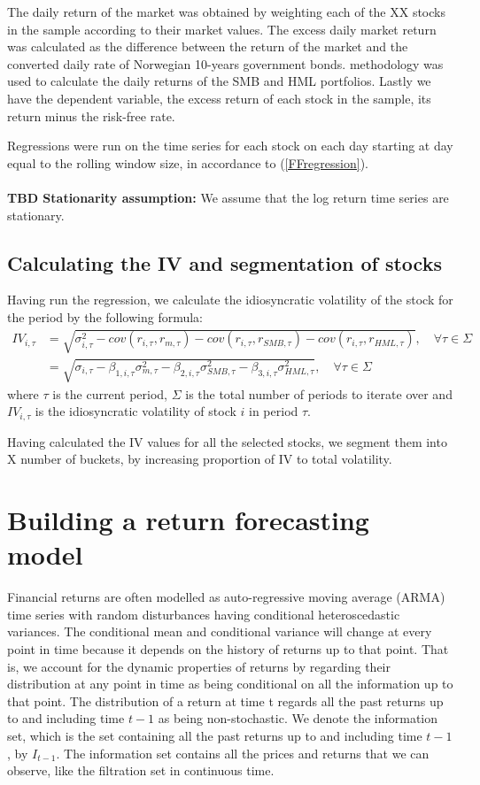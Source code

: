 The daily return of the market was obtained by weighting each of the XX stocks in the sample according to their market values. The excess daily market return was calculated as the difference between the return of the market and the converted daily rate of Norwegian 10-years government bonds. \cite{famafrench} methodology was used to calculate the daily returns of the SMB and HML portfolios. Lastly we have the dependent variable, the excess return of each stock in the sample, its return minus the risk-free rate.

Regressions were run on the time series for each stock on each day starting at day equal to the rolling window size, in accordance to  (\ref{FFregression}). 
\\\\
\textbf{TBD Stationarity assumption: } We assume that the log return time series are stationary.

\subsection*{Calculating the IV and segmentation of stocks}
Having run the regression, we calculate the idiosyncratic volatility of the stock for the period by the following formula:
 \begin{align}
    IV_{i,\tau} &= \sqrt{\sigma_{i,\tau}^{2} - cov(r_{i,\tau},r_{m,\tau}) - cov(r_{i,\tau},r_{SMB,\tau}) - cov(r_{i,\tau},r_{HML,\tau})}, \quad \forall \tau \in \Sigma \\
    &= \sqrt{\sigma_{i,\tau} - \beta_{1,i,\tau} \sigma_{m,\tau}^{2}- \beta_{2,i,\tau} \sigma_{SMB,\tau}^{2}- \beta_{3,i,\tau} \sigma_{HML,\tau}^{2}}, \quad \forall \tau \in \Sigma
\end{align}
where $\tau$ is the current period, $\Sigma$ is the total number of periods to iterate over and $IV_{i,\tau}$ is the idiosyncratic volatility of stock $i$ in period $\tau$.

Having calculated the IV values for all the selected stocks, we segment them into X number of buckets, by increasing proportion of IV to total volatility.

\section*{Building a return forecasting model} 


Financial returns are often modelled as auto-regressive moving average (ARMA) time series with random disturbances having conditional heteroscedastic variances. The conditional mean and conditional variance will change at every point in time because it depends on the history of returns up to that point. That is, we account for the dynamic properties of returns by regarding their distribution at any point in time as being conditional on all the information up to that point. The distribution of a return at time t regards all the past returns up to and including time $t-1$ as being non-stochastic. We denote the information set, which is the set containing all the past returns up to and including time $t-1$, by $I_{t-1}$. The information set contains all the prices and returns that we can observe, like the filtration set in continuous time. 

